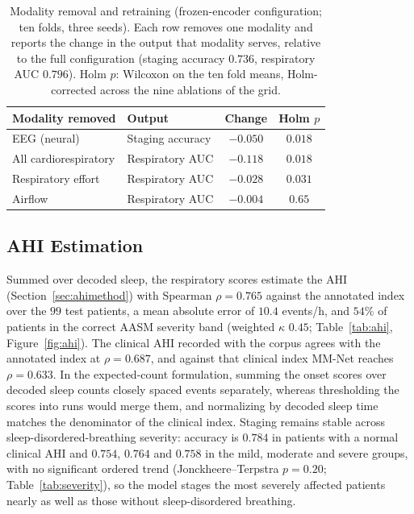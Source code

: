 \documentclass[a4paper,fleqn]{cas-sc}
\newcommand{\mmRho}{0.765}
\begin{document}
\begin{table}[H]
\caption{Modality removal and retraining (frozen-encoder configuration; ten folds, three seeds).
Each row removes one modality and reports the change in the output that modality serves, relative
to the full configuration (staging accuracy $0.736$, respiratory AUC $0.796$). Holm $p$: Wilcoxon
on the ten fold means, Holm-corrected across the nine ablations of the grid.}
\label{tab:ablate}
\centering
\small
\setlength{\tabcolsep}{6pt}
\begin{tabular}{llcc}
\toprule
Modality removed & Output & Change & Holm $p$ \\
\midrule
EEG (neural)            & Staging accuracy & $-0.050$ & $0.018$ \\
All cardiorespiratory   & Respiratory AUC  & $-0.118$ & $0.018$ \\
Respiratory effort      & Respiratory AUC  & $-0.028$ & $0.031$ \\
Airflow                 & Respiratory AUC  & $-0.004$ & $0.65$ \\
\bottomrule
\end{tabular}
\end{table}

\subsection{AHI Estimation}
\label{sec:ahi}
Summed over decoded sleep, the respiratory scores estimate the AHI
(Section~\ref{sec:ahimethod}) with Spearman $\rho=\mmRho$ against the annotated index over the
$99$ test patients, a mean absolute error of $10.4$ events/h, and $54\%$ of patients in the
correct AASM severity band (weighted $\kappa$ $0.45$; Table~\ref{tab:ahi}, Figure~\ref{fig:ahi}). The clinical AHI
recorded with the corpus agrees with the annotated index at $\rho=0.687$, and against that
clinical index MM-Net reaches $\rho=0.633$. In the expected-count formulation, summing the onset
scores over decoded sleep counts closely spaced events separately, whereas thresholding the scores
into runs would merge them, and normalizing by decoded sleep time matches the denominator of the
clinical index. Staging remains stable across sleep-disordered-breathing severity: accuracy is $0.784$ in patients
with a normal clinical AHI and $0.754$, $0.764$ and $0.758$ in the mild, moderate and severe
groups, with no significant ordered trend (Jonckheere--Terpstra $p=0.20$;
Table~\ref{tab:severity}), so the model stages the most severely affected patients nearly as well
as those without sleep-disordered breathing.
\end{document}
